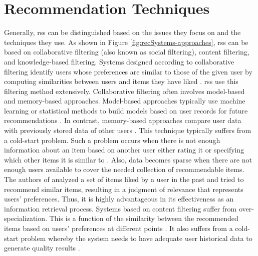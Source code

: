 \section{Recommendation Techniques}
Generally, \glspl{rs} can be distinguished based on the issues they focus on and the techniques they use. As shown in Figure \ref{fig:recSystems-approaches}, \glspl{rs} can be based on collaborative filtering (also known as social filtering), content filtering, and knowledge-based filtering. Systems designed according to collaborative filtering identify users whose preferences are similar to those of the given user by computing similarities between users and items they have liked \parencite{Balabanovic1997Content-BasedRecommendation}. \Glspl{rs} use this filtering method extensively. Collaborative filtering often involves model-based and memory-based approaches. Model-based approaches typically use machine learning or statistical methods to build models based on user records for future recommendations \parencite{Chu2012DoesImages}. In contrast, memory-based approaches compare user data with previously stored data of other users \parencite{Schiaffino2006PoliteAgents}. This technique typically suffers from a cold-start problem. Such a problem occurs when there is not enough information about an item based on another user either rating it or specifying which other items it is similar to \parencite{Balabanovic1997Content-BasedRecommendation}. Also, data becomes sparse when there are not enough users available to cover the needed collection of recommendable items. The authors of \parencite{Gao2015Content-awareNetworks, Lian2015Content-AwareData} analyzed a set of items liked by a user in the past and tried to recommend similar items, resulting in a judgment of relevance that represents users’ preferences. Thus, it is highly advantageous in its effectiveness as an information retrieval process. Systems based on content filtering suffer from over-specialization. This is a function of the similarity between the recommended items based on users’ preferences at different points \parencite{Lops2011Content-basedTrends}. It also suffers from a cold-start problem whereby the system needs to have adequate user historical data to generate quality results \parencite{Burke2002HybridInteraction}. 

